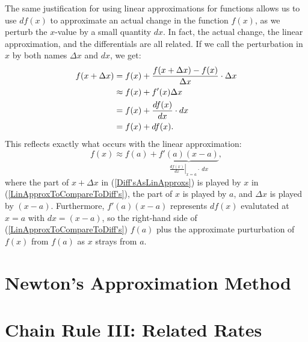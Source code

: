 The same justification for using linear approximations for functions
allows us to use $df(x)$ to approximate an actual change in
the function $f(x)$, as we perturb the $x$-value by a small
quantity $dx$.  In fact, the actual change, the linear
approximation, and the differentials are all related.
If we call the perturbation in $x$ by both names $\Delta x$ and 
$dx$, we get:
\begin{align}
f(x+\Delta x)&=f(x)+\frac{f(x+\Delta x)-f(x)}{\Delta x}\cdot\Delta x\notag\\
             &\approx f(x)+f'(x)\Delta x\notag\\
             &= f(x)+\frac{df(x)}{dx}\cdot dx\label{Diff'sAsLinApproxs}\\
             &= f(x)+df(x).\notag
\end{align}
This reflects exactly what occurs with the linear approximation:
\begin{equation}
        f(x)\approx f(a)+\underbrace{f'(a)(x-a)}_{
         \left.\frac{df(x)}{dx}\right|_{x=a}\cdot\ dx}
        ,\label{LinApproxToCompareToDiff's}\end{equation}
where the part of $x+\Delta x$ in (\ref{Diff'sAsLinApproxs})
is played by $x$ in (\ref{LinApproxToCompareToDiff's}),
the part of $x$ is played by $a$, and $\Delta x$ is played by
$(x-a)$.  Furthermore, $f'(a)(x-a)$ represents $df(x)$
evalutated at $x=a$ with $dx=(x-a)$, so the right-hand side
of (\ref{LinApproxToCompareToDiff's}) $f(a)$ plus
the approximate purturbation of $f(x)$ from $f(a)$ as 
$x$ strays from $a$.
\newpage





\section{Newton's Approximation Method\label{Newton'sMethodSection}}

\section{Chain Rule III: Related Rates}

